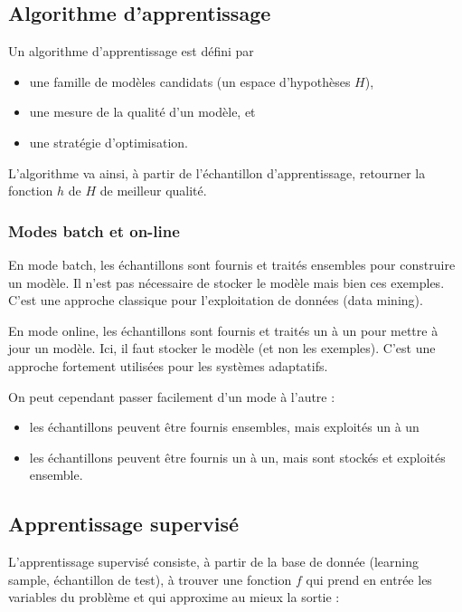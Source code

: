 		\subsection{Algorithme d'apprentissage}
		
		Un algorithme d'apprentissage est défini par

		\begin{itemize}
			\item une famille de modèles candidats (un espace d'hypothèses $H$),
			\item une mesure de la qualité d'un modèle, et
			\item une stratégie d'optimisation.
		\end{itemize}

		L'algorithme va ainsi, à partir de l'échantillon d'apprentissage, retourner la fonction $h$ de $H$ de meilleur qualité.
					
			\subsubsection{Modes batch et on-line}
		
			En mode batch, les échantillons sont fournis et traités ensembles pour construire un modèle. Il n'est pas nécessaire de stocker le modèle mais bien ces exemples. C'est une approche classique pour l'exploitation de données (data mining).
			
		En mode online, les échantillons sont fournis et traités un à un pour mettre à jour un modèle. Ici, il faut stocker le modèle (et non les exemples). C'est une approche fortement utilisées pour les systèmes adaptatifs.
		
			On peut cependant passer facilement d'un mode à l'autre :
		
			\begin{itemize}
				\item les échantillons peuvent être fournis ensembles, mais exploités un à un
				\item les échantillons peuvent être fournis un à un, mais sont stockés et exploités ensemble.
			\end{itemize}
		
		\subsection{Apprentissage supervisé}
		
		L'apprentissage supervisé consiste, à partir de la base de donnée (learning sample, échantillon de test), à trouver une fonction $f$ qui prend en entrée les variables du problème et qui approxime au mieux la sortie :

